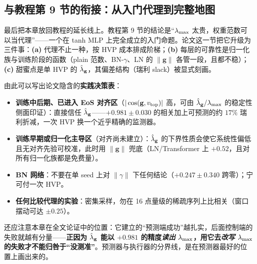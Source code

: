 \subsection{与教程第 9 节的衔接：从入门代理到完整地图}
\label{sec:ch04-practice}

最后把本章放回教程的延长线上。教程第 9 节的结论是“$\lambda_{\max}$
太贵，权重范数可以当代理”——一个在 tanh MLP
上完全成立的入门命题。论文这一节把它升级为三件事：\textbf{(a)} 代理不止一种，按
HVP 成本排成阶梯；\textbf{(b)} 每层的可靠性是归一化族与训练阶段的函数（plain
范数、BN-$\gamma$、LN 的 $\|\mathbf{g}\|$ 各管一段，且都不稳）；\textbf{(c)}
甜蜜点是单 HVP 的 $\hat{\lambda}_{\mathbf{g}}$，其偏差结构（瑞利 slack）被显式刻画。

由此可以写出论文隐含的\textbf{实践决策表}：
\begin{itemize}
  \item \textbf{训练中后期、已进入 EoS 对齐区}（$|\cos(\mathbf{g},v_{\mathrm{top}})|$
高，可由 $\hat{\lambda}_{\mathbf{g}}/\lambda_{\max}$ 的稳定性侧面印证）：直接信任 $\hat{\lambda}_{\mathbf{g}}$——$+0.981\pm0.030$
的相关加上可预测的约 $17\%$ 瑞利折减，一次 HVP 换一个近乎精确的监测器。
  \item \textbf{训练早期或归一化主导区}（对齐尚未建立）：$\hat{\lambda}_{\mathbf{g}}$
的下界性质会使它系统性偏低且无对齐先验可校准，此时用 $\|\mathbf{g}\|$
兜底（LN/Transformer 上 $+0.52$，且对所有归一化族都是免费量）。
  \item \textbf{BN 网络}：不要在单 seed 上对 $\|\gamma\|$
下任何结论（$+0.247\pm0.340$ 跨零）；宁可付一次 HVP。
  \item \textbf{任何比较代理的实验}：密集采样，勿在 16
点量级的稀疏序列上比相关（窗口摆动可达 $\pm0.25$）。
\end{itemize}

还应注意本章在全文论证中的位置：它建立的“预测端成功”越扎实，后面控制端的失败就越有分量——\textbf{正因为
$\hat{\lambda}_{\mathbf{g}}$ 能以 $+0.981$ 的精度\emph{读出} $\lambda_{\max}$，用它去\emph{改写} $\lambda_{\max}$
的失败才不能归咎于“没测准”}。预测器与执行器的分界线，是在预测器最好的位置上画出来的。

